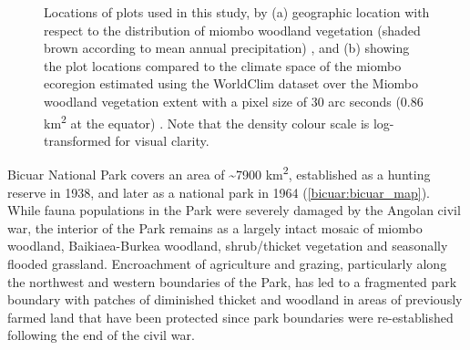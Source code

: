 \begin{refsection}
\begin{figure}[!h]
	\centering
    \qquad
{}%
\caption[Location of study sites within the miombo ecoregion and within climate space]{Locations of plots used in this study, by (a) geographic location with respect to the distribution of miombo woodland vegetation (shaded brown according to mean annual precipitation) \citep{White1983}, and (b) showing the plot locations compared to the climate space of the miombo ecoregion estimated using the WorldClim dataset over the Miombo woodland vegetation extent with a pixel size of 30 arc seconds (0.86 km\textsuperscript{2} at the equator) \citep{Fick2017}. Note that the density colour scale is log-transformed for visual clarity.}
\end{figure}




Bicuar National Park covers an area of \textasciitilde{}7900 km\textsuperscript{2}, established as a hunting reserve in 1938, and later as a national park in 1964 (\autoref{bicuar:bicuar_map}). While fauna populations in the Park were severely damaged by the Angolan civil war, the interior of the Park remains as a largely intact mosaic of miombo woodland, Baikiaea-Burkea woodland, shrub/thicket vegetation and seasonally flooded grassland. Encroachment of agriculture and grazing, particularly along the northwest and western boundaries of the Park, has led to a fragmented park boundary with patches of diminished thicket and woodland in areas of previously farmed land that have been protected since park boundaries were re-established following the end of the civil war.


\end{refsection}
